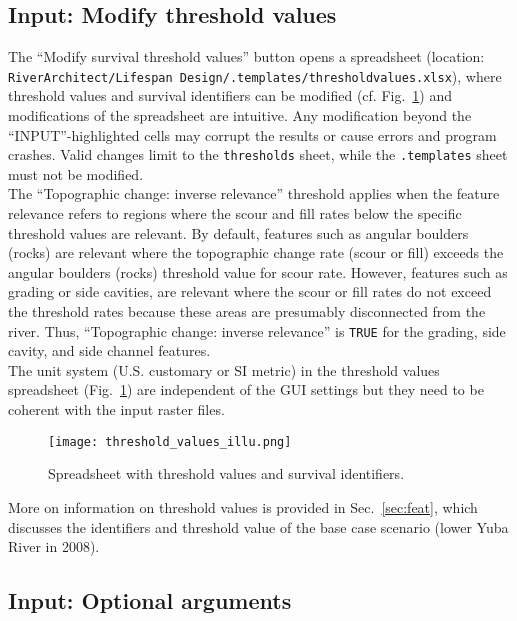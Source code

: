 \subsection{Input: Modify threshold values} \label{sec:modthresh}
The ``Modify survival threshold values'' button opens a spreadsheet (location: \texttt{RiverArchitect/Lifespan Design/.templates/threshold{\myUnderscore}values.xlsx}), where threshold values and survival identifiers can be modified (cf. Fig.~\ref{fig:threshold_values_illu}) and modifications of the spreadsheet are intuitive. Any modification beyond the ``INPUT''-highlighted cells may corrupt the results or cause errors and program crashes. Valid changes limit to the \texttt{thresholds} sheet, while the \texttt{.templates} sheet must not be modified.\\
The ``Topographic change: inverse relevance'' threshold applies when the feature relevance refers to regions where the scour and fill rates below the specific threshold values are relevant. By default, features such as angular boulders (rocks) are relevant where the topographic change rate (scour or fill) exceeds the angular boulders (rocks) threshold value for scour rate. However, features such as grading or side cavities, are relevant where the scour or fill rates do not exceed the threshold rates because these areas are presumably disconnected from the river. Thus, ``Topographic change: inverse relevance'' is \texttt{TRUE} for the grading, side cavity, and side channel features.\\
The unit system (U.S. customary or SI metric) in the threshold values spreadsheet (Fig.~\ref{fig:threshold_values_illu}) are independent of the GUI settings but they need to be coherent with the input raster files. 

\begin{figure}[hbt]
	\begin{center}
	\texttt{[image: threshold\_values\_illu.png]} %
	\caption{Spreadsheet with threshold values and survival identifiers. \label{fig:threshold_values_illu}}
	\end{center}
\end{figure}

More on information on threshold values is provided in Sec.~\ref{sec:feat}, which discusses the identifiers and threshold value of the base case scenario (lower Yuba River in 2008).

\subsection{Input: Optional arguments}

